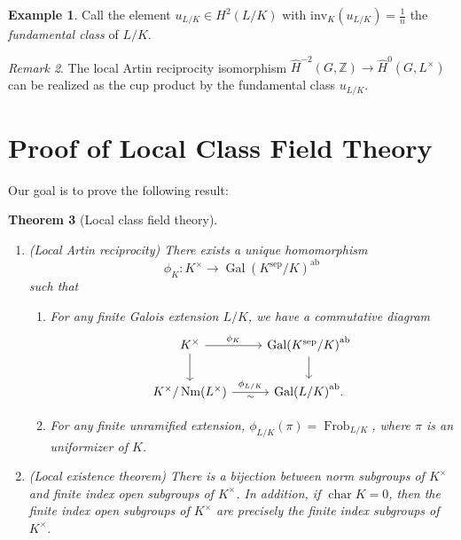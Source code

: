 \documentclass[leqno, openany]{memoir}
\newtheorem{thm}{Theorem}[section]
\theoremstyle{definition}
\newtheorem{exm}[thm]{Example}
\theoremstyle{remark}
\newtheorem{rmk}[thm]{Remark}
\theoremstyle{plain}
\theoremstyle{definition}
\theoremstyle{remark}
\newcommand{\Z}{\mathbb{Z}}
\newcommand{\mr}[1]{\mathrm{#1}}
\newcommand{\wh}[1]{\widehat{#1}}
\DeclareMathOperator{\Gal}{Gal}
\DeclareMathOperator{\Nm}{Nm}
\DeclareMathOperator{\Frob}{Frob}
\begin{document}
\begin{exm}
    Call the element $u_{L/K} \in H^2(L/K)$ with $\mr{inv}_K(u_{L/K}) = \frac{1}{n}$ the \textit{fundamental class} of $L/K$. 
\end{exm}

\begin{rmk}
    The local Artin reciprocity isomorphism $\wh{H}^{-2}(G, \Z) \to \wh{H}^0(G, L^{\times})$ can be realized as the cup product by the fundamental class $u_{L/K}$.
\end{rmk}

\section{Proof of Local Class Field Theory}%
\label{sec:proof_of_local_class_field_theory}

Our goal is to prove the following result:

\begin{thm}[Local class field theory]\leavevmode
    \begin{enumerate}
        \item (Local Artin reciprocity) There exists a unique homomorphism
            \[ \phi_K \colon K^{\times} \to {\Gal(K^{\mr{sep}}/K)}^{\mr{ab}} \]
            such that
            \begin{enumerate}
                \item For any finite Galois extension $L/K$, we have a commutative diagram
                    \begin{equation*}
                    \begin{tikzcd}
                        K^{\times} \ar{d} \ar{r}{\phi_K} & {\Gal(K^{\mr{sep}}/K)}^{\mr{ab}} \ar{d} \\
                        K^{\times}/\Nm(L^{\times}) \ar{r}{\phi_{L/K}}[swap]{\sim} & {\Gal(L/K)}^{\mr{ab}}.
                    \end{tikzcd}
                    \end{equation*}
                \item For any finite unramified extension, $\phi_{L/K}(\pi) = \Frob_{L/K}$, where $\pi$ is an uniformizer of $K$.
            \end{enumerate}
        \item (Local existence theorem) There is a bijection between norm subgroups of $K^{\times}$ and finite index open subgroups of $K^{\times}$. In addition, if $\operatorname{char} K = 0$, then the finite index open subgroups of $K^{\times}$ are precisely the finite index subgroups of $K^{\times}$.
    \end{enumerate}
\end{thm}
\end{document}
